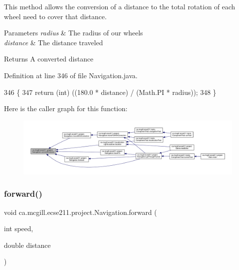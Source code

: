 This method allows the conversion of a distance to the total rotation of each wheel need to cover that distance.


\begin{DoxyParams}{Parameters}
{\em radius} & The radius of our wheels \\
\hline
{\em distance} & The distance traveled \\
\hline
\end{DoxyParams}
\begin{DoxyReturn}{Returns}
A converted distance 
\end{DoxyReturn}


Definition at line 346 of file Navigation.\+java.


\begin{DoxyCode}
346                                                                     \{
347     \textcolor{keywordflow}{return} (\textcolor{keywordtype}{int}) ((180.0 * distance) / (Math.PI * radius));
348   \}
\end{DoxyCode}
Here is the caller graph for this function\+:
\nopagebreak
\begin{figure}[H]
\begin{center}
\leavevmode
\includegraphics[width=350pt]{classca_1_1mcgill_1_1ecse211_1_1project_1_1_navigation_ac9e260bcd619ffa4820d7d0de7ea1c12_icgraph}
\end{center}
\end{figure}
\mbox{\label{classca_1_1mcgill_1_1ecse211_1_1project_1_1_navigation_a7c66610c5b7496ddb35d342ab2cd3f08}} 
\subsubsection{\texorpdfstring{forward()}{forward()}}
{\footnotesize\ttfamily void ca.\+mcgill.\+ecse211.\+project.\+Navigation.\+forward (\begin{DoxyParamCaption}\item[{int}]{speed,  }\item[{double}]{distance }\end{DoxyParamCaption})}

